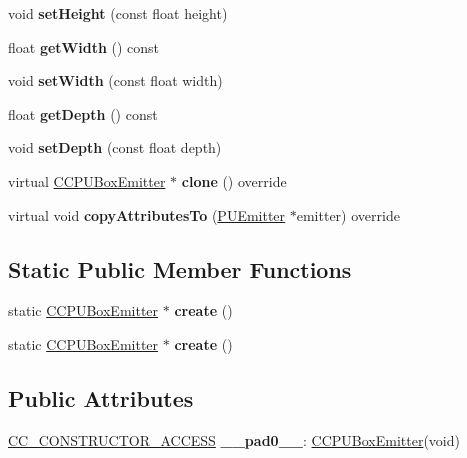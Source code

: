 \begin{DoxyCompactItemize}
void {\bfseries set\+Height} (const float height)
\item 
\mbox{\label{classCCPUBoxEmitter_a97b157fd33177d9590277497f3ad1bdb}} 
float {\bfseries get\+Width} () const
\item 
\mbox{\label{classCCPUBoxEmitter_a3b1cd528e3ee2cc2a203cf2a03d1ad5e}} 
void {\bfseries set\+Width} (const float width)
\item 
\mbox{\label{classCCPUBoxEmitter_a64129aea8e4ffc32aba62a54f64d68ac}} 
float {\bfseries get\+Depth} () const
\item 
\mbox{\label{classCCPUBoxEmitter_ac288b3c689bee4f7b181f457f1c7ff44}} 
void {\bfseries set\+Depth} (const float depth)
\item 
\mbox{\label{classCCPUBoxEmitter_a8f7a5a6173ca9204a9cfd0d4369c5063}} 
virtual \hyperlink{classCCPUBoxEmitter}{C\+C\+P\+U\+Box\+Emitter} $\ast$ {\bfseries clone} () override
\item 
\mbox{\label{classCCPUBoxEmitter_acf3a48d0b817a5af1b18f08b3dda1fdd}} 
virtual void {\bfseries copy\+Attributes\+To} (\hyperlink{classPUEmitter}{P\+U\+Emitter} $\ast$emitter) override
\end{DoxyCompactItemize}
\subsection*{Static Public Member Functions}
\begin{DoxyCompactItemize}
\item 
\mbox{\label{classCCPUBoxEmitter_a7b0d4960401c2be4cfc84ae5bacfbc3b}} 
static \hyperlink{classCCPUBoxEmitter}{C\+C\+P\+U\+Box\+Emitter} $\ast$ {\bfseries create} ()
\item 
\mbox{\label{classCCPUBoxEmitter_abfec2269596a21066e3d1a4c39a4c103}} 
static \hyperlink{classCCPUBoxEmitter}{C\+C\+P\+U\+Box\+Emitter} $\ast$ {\bfseries create} ()
\end{DoxyCompactItemize}
\subsection*{Public Attributes}
\begin{DoxyCompactItemize}
\item 
\mbox{\label{classCCPUBoxEmitter_aac9ce8e24edd4a383ebcc1d758293b95}} 
\hyperlink{_2cocos2d_2cocos_2base_2ccConfig_8h_a25ef1314f97c35a2ed3d029b0ead6da0}{C\+C\+\_\+\+C\+O\+N\+S\+T\+R\+U\+C\+T\+O\+R\+\_\+\+A\+C\+C\+E\+SS} {\bfseries \+\_\+\+\_\+pad0\+\_\+\+\_\+}\+: \hyperlink{classCCPUBoxEmitter}{C\+C\+P\+U\+Box\+Emitter}(void)
\end{DoxyCompactItemize}

